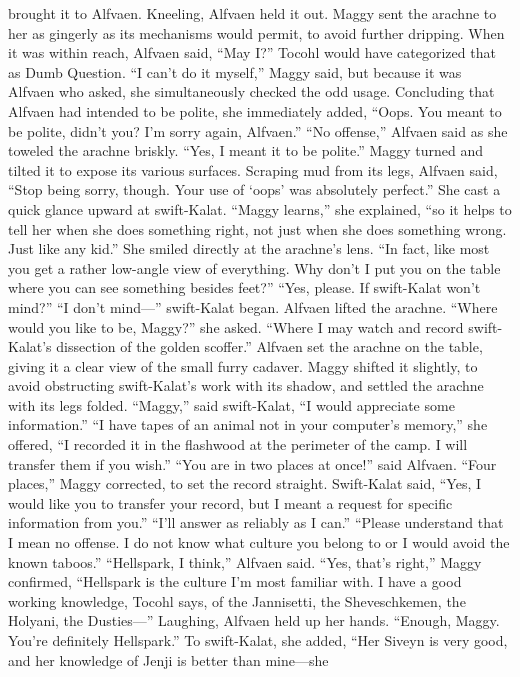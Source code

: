 \documentclass[9pt]{article}
\begin{document}
brought it to Alfvaen.
Kneeling, Alfvaen held it out. Maggy sent the arachne to her as gingerly as its mechanisms would
permit, to avoid further dripping. When it was within reach, Alfvaen said, “May I?”
Tocohl would have categorized that as Dumb Question. “I can’t do it myself,” Maggy said, but
because it was Alfvaen who asked, she simultaneously checked the odd usage. Concluding that Alfvaen
had intended to be polite, she immediately added, “Oops. You meant to be polite, didn’t you? I’m sorry
again, Alfvaen.”
“No offense,” Alfvaen said as she toweled the arachne briskly. “Yes, I meant it to be polite.” Maggy
turned and tilted it to expose its various surfaces. Scraping mud from its legs, Alfvaen said, “Stop being
sorry, though. Your use of ‘oops’ was absolutely perfect.”
She cast a quick glance upward at swift-Kalat. “Maggy learns,” she explained, “so it helps to tell her
when she does something right, not just when she does something wrong. Just like any kid.” She smiled
directly at the arachne’s lens. “In fact, like most you get a rather low-angle view of everything. Why don’t
I put you on the table where you can see something besides feet?”
“Yes, please. If swift-Kalat won’t mind?”
“I don’t mind—” swift-Kalat began. Alfvaen lifted the arachne. “Where would you like to be,
Maggy?” she asked.
“Where I may watch and record swift-Kalat’s dissection of the golden scoffer.”
Alfvaen set the arachne on the table, giving it a clear view of the small furry cadaver. Maggy shifted it
slightly, to avoid obstructing swift-Kalat’s work with its shadow, and settled the arachne with its legs
folded.
“Maggy,” said swift-Kalat, “I would appreciate some information.”
“I have tapes of an animal not in your computer’s memory,” she offered, “I recorded it in the
flashwood at the perimeter of the camp. I will transfer them if you wish.”
“You are in two places at once!” said Alfvaen.
“Four places,” Maggy corrected, to set the record straight.
Swift-Kalat said, “Yes, I would like you to transfer your record, but I meant a request for specific
information from you.”
“I’ll answer as reliably as I can.”
“Please understand that I mean no offense. I do not know what culture you belong to or I would
avoid the known taboos.”
“Hellspark, I think,” Alfvaen said.
“Yes, that’s right,” Maggy confirmed, “Hellspark is the culture I’m most familiar with. I have a good
working knowledge, Tocohl says, of the Jannisetti, the Sheveschkemen, the Holyani, the Dusties—”
Laughing, Alfvaen held up her hands. “Enough, Maggy. You’re definitely Hellspark.” To
swift-Kalat, she added, “Her Siveyn is very good, and her knowledge of Jenji is better than mine—she
\end{document}

